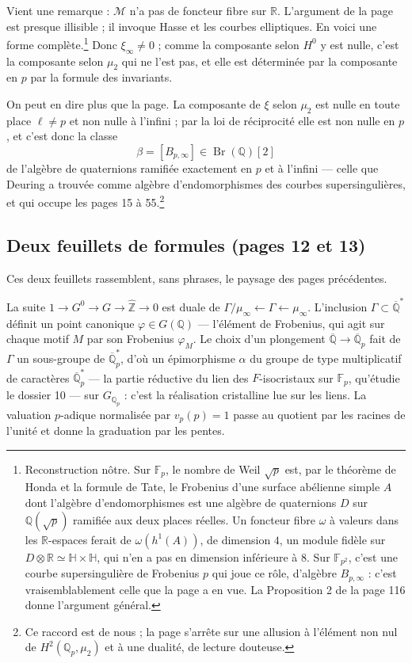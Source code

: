 \documentclass[11pt,a4paper]{article}
\begin{document}
Vient une remarque : $\mathcal{M}$ n'a pas de foncteur fibre sur $\mathbb{R}$.
L'argument de la page est presque illisible ; il invoque Hasse et les courbes
elliptiques. En voici une forme complète.\footnote{Reconstruction nôtre. Sur
$\mathbb{F}_{p}$, le nombre de Weil $\sqrt{p}$ est, par le théorème de Honda et
la formule de Tate, le Frobenius d'une surface abélienne simple $A$ dont
l'algèbre d'endomorphismes est une algèbre de quaternions $D$ sur
$\mathbb{Q}(\sqrt{p})$ ramifiée aux deux places réelles. Un foncteur fibre
$\omega$ à valeurs dans les $\mathbb{R}$-espaces ferait de $\omega(h^{1}(A))$,
de dimension $4$, un module fidèle sur $D \otimes \mathbb{R} \simeq \mathbb{H}
\times \mathbb{H}$, qui n'en a pas en dimension inférieure à $8$. Sur
$\mathbb{F}_{p^{2}}$, c'est une courbe supersingulière de Frobenius $p$ qui
joue ce rôle, d'algèbre $B_{p,\infty}$ : c'est vraisemblablement celle que la
page a en vue. La Proposition 2 de la page 116 donne l'argument général.} Donc
$\xi_{\infty} \neq 0$ ; comme la composante selon $H^{0}$ y est nulle, c'est la
composante selon $\mu_{2}$ qui ne l'est pas, et elle est déterminée par la
composante en $p$ par la formule des invariants.

On peut en dire plus que la page. La composante de $\xi$ selon $\mu_{2}$ est
nulle en toute place $\ell \neq p$ et non nulle à l'infini ; par la loi de
réciprocité elle est non nulle en $p$, et c'est donc la classe
\[
  \beta = [B_{p,\infty}] \in \operatorname{Br}(\mathbb{Q})[2]
\]
de l'algèbre de quaternions ramifiée exactement en $p$ et à l'infini --- celle
que Deuring a trouvée comme algèbre d'endomorphismes des courbes
supersingulières, et qui occupe les pages 15 à 55.\footnote{Ce raccord est de
nous ; la page s'arrête sur une allusion à l'élément non nul de
$H^{2}(\mathbb{Q}_{p}, \mu_{2})$ et à une dualité, de lecture douteuse.}

\subsection*{Deux feuillets de formules (pages 12 et 13)}

Ces deux feuillets rassemblent, sans phrases, le paysage des pages
précédentes.

La suite $1 \to G^{0} \to G \to \widehat{\mathbb{Z}} \to 0$ est duale de
$\Gamma/\mu_{\infty} \leftarrow \Gamma \leftarrow \mu_{\infty}$. L'inclusion
$\Gamma \subset \overline{\mathbb{Q}}^{*}$ définit un point canonique
$\varphi \in G(\mathbb{Q})$ --- l'élément de Frobenius, qui agit sur chaque
motif $M$ par son Frobenius $\varphi_{M}$. Le choix d'un plongement
$\overline{\mathbb{Q}} \to \overline{\mathbb{Q}}_{p}$ fait de $\Gamma$ un
sous-groupe de $\overline{\mathbb{Q}}_{p}^{*}$, d'où un épimorphisme $\alpha$ du
groupe de type multiplicatif de caractères $\overline{\mathbb{Q}}_{p}^{*}$ ---
la partie réductive du lien des $F$-isocristaux sur $\mathbb{F}_{p}$, qu'étudie
le dossier 10 --- sur $G_{\mathbb{Q}_{p}}$ : c'est la réalisation cristalline
lue sur les liens. La valuation $p$-adique normalisée par $v_{p}(p) = 1$ passe
au quotient par les racines de l'unité et donne la graduation par les pentes.
\end{document}
